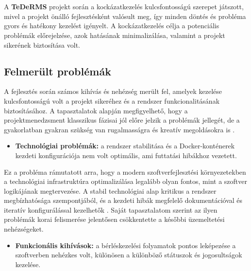 \chapter{\riskproblem}

A \textbf{TeDeRMS} projekt során a kockázatkezelés kulcsfontosságú szerepet játszott, 
mivel a projekt önálló fejlesztésként valósult meg, így minden döntés és probléma gyors és hatékony kezelést igényelt. 
A kockázatkezelés célja a potenciális problémák előrejelzése, azok hatásának minimalizálása, 
valamint a projekt sikerének biztosítása volt.

\section{Felmerült problémák}

A fejlesztés során számos kihívás és nehézség merült fel, amelyek kezelése kulcsfontosságú volt a 
projekt sikeréhez és a rendszer funkcionalitásának biztosításához. 
A tapasztalatok alapján megfigyelhető, hogy a projektmenedzsment klasszikus fázisai jól előre jelzik a 
problémák jellegét, de a gyakorlatban gyakran szükség van rugalmasságra és kreatív megoldásokra is \cite{Hajdu2014,Szalay2018}.

\begin{itemize}
    \item \textbf{Technológiai problémák:} a rendszer stabilitása és a Docker-konténerek kezdeti konfigurációja nem volt optimális, ami futtatási hibákhoz vezetett.
\end{itemize}

Ez a probléma rámutatott arra, hogy a modern szoftverfejlesztési környezetekben a technológiai infrastruktúra 
optimalizálása legalább olyan fontos, mint a szoftver logikájának megtervezése. 
A stabil technológiai alap kritikus a rendszer megbízhatósága szempontjából, 
és a kezdeti hibák megfelelő dokumentációval és iteratív konfigurálással kezelhetők \cite{Kovacs2016,Kaposi2019}. 
Saját tapasztalatom szerint az ilyen problémák korai felismerése jelentősen csökkentette a későbbi üzemeltetési nehézségeket.

\begin{itemize}
    \item \textbf{Funkcionális kihívások:} a bérléskezelési folyamatok pontos leképezése a szoftverben nehézkes volt, különösen a különböző státuszok és jogosultságok kezelése.
\end{itemize}

